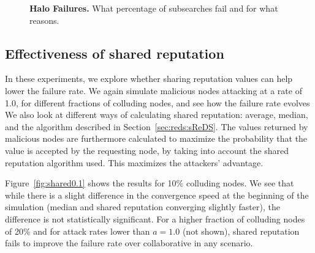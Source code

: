 \begin{figure}[t!]
\centering {}
\hspace{0.5cm} 
 \caption{{\bf Halo Failures.} What percentage of subsearches fail and
   for what reasons.}
      \label{fig:failure_graphs}
\end{figure}

\subsection{Effectiveness of shared reputation}\label{sec:results-shared}
In these experiments, we explore whether 
sharing reputation values can help lower the failure rate. We again
simulate malicious nodes attacking at a rate of 1.0, for different
fractions of colluding nodes, and see how the failure rate evolves
We also look at different ways of calculating shared reputation:
average, median, and the \sharedrep algorithm described in
Section~\ref{sec:reds:sReDS}.
The values returned by malicious nodes are furthermore calculated to
maximize the probability that the value is accepted by the requesting
node, by taking into account the shared reputation algorithm used. This
maximizes the attackers' advantage.


Figure~\ref{fig:shared0.1} shows the results for 10\% colluding
nodes. We see that while there is a slight difference in the
convergence speed at the beginning of the simulation (median and
\sharedrep shared reputation converging slightly faster), the difference
is not statistically significant. For a higher fraction of
colluding nodes of 20\% and for attack rates lower than $a=1.0$ (not
shown), shared reputation fails to improve the failure rate over
collaborative in any scenario.

